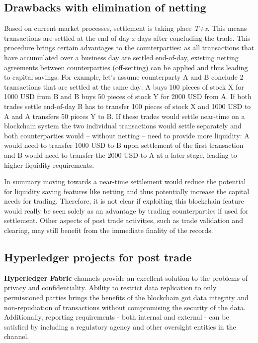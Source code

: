 \subsection{Drawbacks with elimination of netting}
Based on current market processes, settlement is taking place \emph{T+x}. This means transactions are settled at the end of day \emph{x} days after concluding the trade. This procedure brings certain advantages to the counterparties: as all transactions that have accumulated over a business day are settled end-of-day, existing netting agreements between counterparties (off-setting) can be applied and thus leading to capital savings. For example, let’s assume counterparty A and B conclude 2 transactions that are settled at the same day: A buys 100 pieces of stock X for 1000 USD from B and B buys 50 pieces of stock Y for 2000 USD from A. If both trades settle end-of-day B has to transfer 100 pieces of stock X and 1000 USD to A and A transfers 50 pieces Y to B. If these trades would settle near-time on a blockchain system the two individual transactions would settle separately and both counterparties would – without netting – need to provide more liquidity: A would need to transfer 1000 USD to B upon settlement of the first transaction and B would need to transfer the 2000 USD to A at a later stage, leading to higher liquidity requirements.

In summary moving towards a near-time settlement would reduce the potential for liquidity saving features like netting and thus potentially increase the capital needs for trading. Therefore, it is not clear if exploiting this blockchain feature would really be seen solely as an advantage by trading counterparties if used for settlement. Other aspects of post trade activities, such as trade validation and clearing, may still benefit from the immediate finality of the records. 

\subsection{Hyperledger projects for post trade}
\textbf{Hyperledger Fabric} channels provide an excellent solution to the problems of privacy and confidentiality. Ability to restrict data replication to only permissioned parties brings the benefits of the blockchain got data integrity and non-repudiation of transactions without compromising the security of the data. Additionally, reporting requirements - both internal and external - can be satisfied by including a regulatory agency and other oversight entities in the channel.

